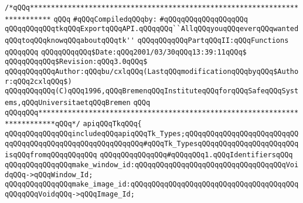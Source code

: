 \label{src/lib/tk/src/export.pkg}
\verb|/*qQQq***************************************************************************|\newline
\verb|qQQq|\newline
\verb|#qQQqCompiledqQQqby:|\newline
\verb|#qQQqqQQqqQQqqQQqqQQq|\newline
\newline
\verb|qQQqqQQqqQQqtkqQQqExportqQQqAPI.qQQqqQQq``AllqQQqyouqQQqeverqQQqwantedqQQqtoqQQqknowqQQqaboutqQQqtk''|\newline
\newline
\verb|qQQqqQQqqQQqPartqQQqII:qQQqFunctions|\newline
\verb|qQQqqQQq|\newline
\verb|qQQqqQQqqQQq$Date:qQQq2001/03/30qQQq13:39:11qQQq$|\newline
\verb|qQQqqQQqqQQq$Revision:qQQq3.0qQQq$|\newline
\newline
\verb|qQQqqQQqqQQqAuthor:qQQqbu/cxlqQQq(LastqQQqmodificationqQQqbyqQQq$Author:qQQq2cxlqQQq$)|\newline
\newline
\verb|qQQqqQQqqQQq(C)qQQq1996,qQQqBremenqQQqInstituteqQQqforqQQqSafeqQQqSystems,qQQqUniversitaetqQQqBremen|\newline
\verb|qQQq|\newline
\verb|qQQqqQQq**************************************************************************qQQq*/|\newline
\newline
\verb|apiqQQqTkqQQq{|\newline
\newline
\verb|qQQqqQQqqQQqqQQqincludeqQQqapiqQQqTk_Types;qQQqqQQqqQQqqQQqqQQqqQQqqQQqqQQqqQQqqQQqqQQqqQQqqQQqqQQqqQQq#qQQqTk_TypesqQQqqQQqqQQqqQQqqQQqqQQqisqQQqfromqQQqqQQqqQQq|\newline
\newline
\newline
\newline
\verb|qQQqqQQqqQQqqQQq#qQQqqQQq1.qQQqIdentifiersqQQq|\newline
\newline
\verb|qQQqqQQqqQQqqQQqmake_window_id:qQQqqQQqqQQqqQQqqQQqqQQqqQQqqQQqqQQqVoidqQQq->qQQqWindow_Id;|\newline
\verb|qQQqqQQqqQQqqQQqmake_image_id:qQQqqQQqqQQqqQQqqQQqqQQqqQQqqQQqqQQqqQQqqQQqqQQqVoidqQQq->qQQqImage_Id;|\newline
